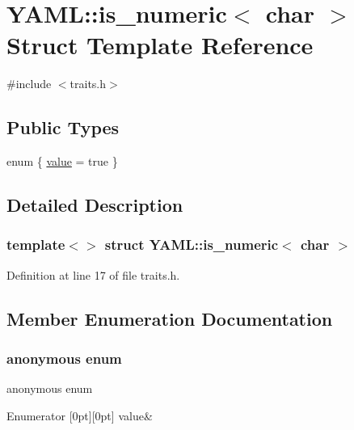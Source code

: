 \hypertarget{struct_y_a_m_l_1_1is__numeric_3_01char_01_4}{}\section{Y\+A\+ML\+::is\+\_\+numeric$<$ char $>$ Struct Template Reference}
\label{struct_y_a_m_l_1_1is__numeric_3_01char_01_4}


{\ttfamily \#include $<$traits.\+h$>$}

\subsection*{Public Types}
\begin{DoxyCompactItemize}
\item 
enum \{ \mbox{\hyperlink{struct_y_a_m_l_1_1is__numeric_3_01char_01_4_acc094b63c779d61581881625516bc6faa3edbe97c5ed3f48162468beb1b088d44}{value}} = true
 \}
\end{DoxyCompactItemize}


\subsection{Detailed Description}
\subsubsection*{template$<$$>$\newline
struct Y\+A\+M\+L\+::is\+\_\+numeric$<$ char $>$}



Definition at line 17 of file traits.\+h.



\subsection{Member Enumeration Documentation}
\mbox{\label{struct_y_a_m_l_1_1is__numeric_3_01char_01_4_acc094b63c779d61581881625516bc6fa}} 
\subsubsection{\texorpdfstring{anonymous enum}{anonymous enum}}
{\footnotesize\ttfamily anonymous enum}

\begin{DoxyEnumFields}{Enumerator}
[0pt][0pt]{}\mbox{\label{struct_y_a_m_l_1_1is__numeric_3_01char_01_4_acc094b63c779d61581881625516bc6faa3edbe97c5ed3f48162468beb1b088d44}} 
value&\\
\hline

\end{DoxyEnumFields}


